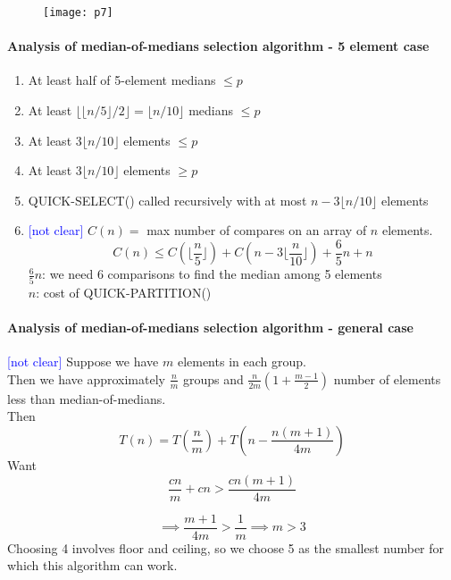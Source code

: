 \documentclass[11pt]{article}
\begin{document}
\begin{figure}[h]
	\centering
	\texttt{[image: p7]}
\end{figure}

\paragraph{Analysis of median-of-medians selection algorithm - 5 element case}
\begin{enumerate}
	\item At least half of 5-element medians $\leq p$
	\item At least $\lfloor\lfloor n / 5 \rfloor / 2 \rfloor = \lfloor n / 10 \rfloor$ medians $\leq p$
	\item At least $3 \lfloor n / 10 \rfloor$ elements $\leq p$
	\item At least $3 \lfloor n / 10 \rfloor$ elements $\geq p$
	\item QUICK-SELECT() called recursively with at most $n - 3 \lfloor n / 10 \rfloor$ elements 
	\item \textcolor{blue}{[not clear]} $C(n) = $ max number of compares on an array of $n$ elements.
	$$C(n) \leq C(\lfloor \frac{n}{5} \rfloor) + C(n - 3\lfloor \frac{n}{10} \rfloor) + \frac{6}{5}n + n$$
	$\frac{6}{5}n$: we need 6 comparisons to find the median among 5 elements  \\
	$n$: cost of QUICK-PARTITION()
\end{enumerate}

\paragraph{Analysis of median-of-medians selection algorithm - general case}
\textcolor{blue}{[not clear]}
Suppose we have $m$ elements in each group. \\
Then we have approximately $\frac{n}{m}$ groups and $\frac{n}{2m}(1 + \frac{m-1}{2})$ number of elements less than median-of-medians. \\
Then $$T(n) = T(\frac{n}{m}) + T(n - \frac{n(m+1)}{4m}) $$
Want $$\frac{cn}{m} + cn > \frac{cn(m+1)}{4m}$$

$$\implies \frac{m+1}{4m} > \frac{1}{m} \implies m > 3$$
Choosing 4 involves floor and ceiling, so we choose 5 as the smallest number for which this algorithm can work.
\end{document}
